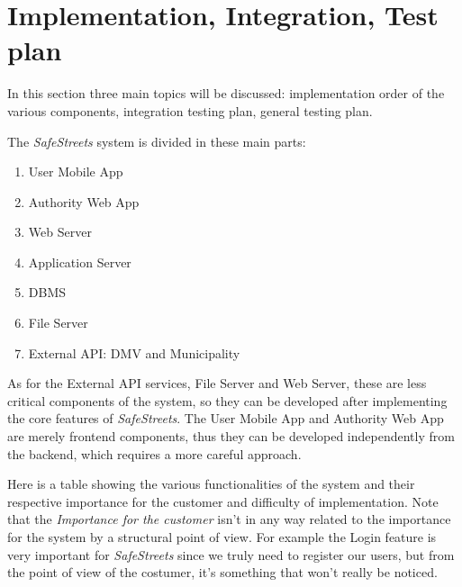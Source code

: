 \section{Implementation, Integration, Test plan}
In this section three main topics will be discussed: implementation order of the
various components, integration testing plan, general testing plan.

The \emph{SafeStreets} system is divided in these main parts:
\begin{enumerate}
    \item User Mobile App
    \item Authority Web App
    \item Web Server
    \item Application Server
    \item DBMS
    \item File Server
    \item External API: DMV and Municipality
\end{enumerate}

As for the External API services, File Server and Web Server, these are less
critical components of the system, so they can be developed after implementing
the core features of \emph{SafeStreets}. The User Mobile App and Authority Web
App are merely frontend components, thus they can be developed independently
from the backend, which requires a more careful approach.

Here is a table showing the various functionalities of the system and their
respective importance for the customer and difficulty of implementation. Note
that the \emph{Importance for the customer} isn't in any way related to the
importance for the system by a structural point of view. For example the Login
feature is very important for \emph{SafeStreets} since we truly need to register
our users, but from the point of view of the costumer, it's something that won't
really be noticed.

